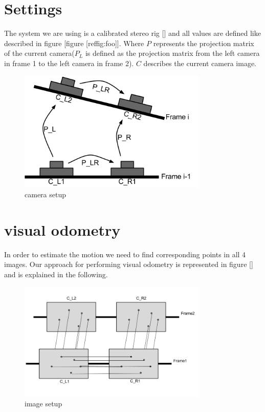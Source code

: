 \documentclass[11pt]{article}
\begin{document}
	\section{Settings}
	The system we are using is a calibrated stereo rig [\cite{malik-hiller-2015}] and all values are defined like described in figure [figure [ref{fig:foo}]]. Where $P$ represents the projection matrix of the current camera($P_L$ is defined as the projection matrix from the left camera in frame 1 to the left camera in frame 2). $C$ describes the current camera image.
	
	\begin{figure}[ht!]
		\centering
		\includegraphics[width=90mm]{images/camera_setup.png}
		\caption{camera setup \label{overflow}}
	\end{figure}
	
	\section{visual odometry}
	In order to estimate the motion we need to find corresponding points in all 4 images. Our approach for performing visual odometry is represented in figure [] and is explained in the following.

	
	\begin{figure}[ht!]
		\centering
		\includegraphics[width=90mm]{images/image_setup.png}
		\caption{image setup \label{overflow}}
	\end{figure}
	
\end{document}
